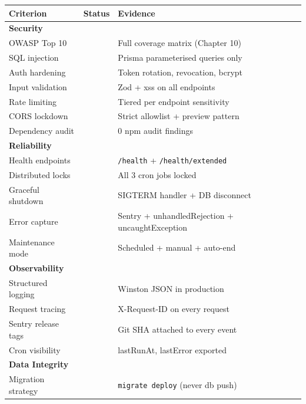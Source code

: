 \documentclass[11pt,a4paper,twoside]{book}
\newcommand{\th}[1]{\textbf{\color{white}#1}}
\newcommand{\yes}{\textcolor{ok}{\faCheckCircle}}
\begin{document}
\begin{center}\small
\begin{tabular}{p{5.5cm}lp{6cm}}
\toprule
\rowcolor{headbg}\th{Criterion} & \th{Status} & \th{Evidence} \\
\midrule
\multicolumn{3}{l}{\textbf{Security}} \\
\midrule
OWASP Top 10         & \yes{} & Full coverage matrix (Chapter 10) \\
\rowcolor{rowalt}SQL injection         & \yes{} & Prisma parameterised queries only \\
Auth hardening        & \yes{} & Token rotation, revocation, bcrypt \\
\rowcolor{rowalt}Input validation      & \yes{} & Zod + xss on all endpoints \\
Rate limiting         & \yes{} & Tiered per endpoint sensitivity \\
\rowcolor{rowalt}CORS lockdown         & \yes{} & Strict allowlist + preview pattern \\
Dependency audit      & \yes{} & 0 npm audit findings \\
\midrule
\multicolumn{3}{l}{\textbf{Reliability}} \\
\midrule
Health endpoints      & \yes{} & \texttt{/health} + \texttt{/health/extended} \\
\rowcolor{rowalt}Distributed locks     & \yes{} & All 3 cron jobs locked \\
Graceful shutdown     & \yes{} & SIGTERM handler + DB disconnect \\
\rowcolor{rowalt}Error capture         & \yes{} & Sentry + unhandledRejection + uncaughtException \\
Maintenance mode      & \yes{} & Scheduled + manual + auto-end \\
\midrule
\multicolumn{3}{l}{\textbf{Observability}} \\
\midrule
Structured logging    & \yes{} & Winston JSON in production \\
\rowcolor{rowalt}Request tracing       & \yes{} & X-Request-ID on every request \\
Sentry release tags   & \yes{} & Git SHA attached to every event \\
\rowcolor{rowalt}Cron visibility       & \yes{} & lastRunAt, lastError exported \\
\midrule
\multicolumn{3}{l}{\textbf{Data Integrity}} \\
\midrule
Migration strategy    & \yes{} & \texttt{migrate deploy} (never db push) \\

\end{tabular}
\end{center}
\end{document}
